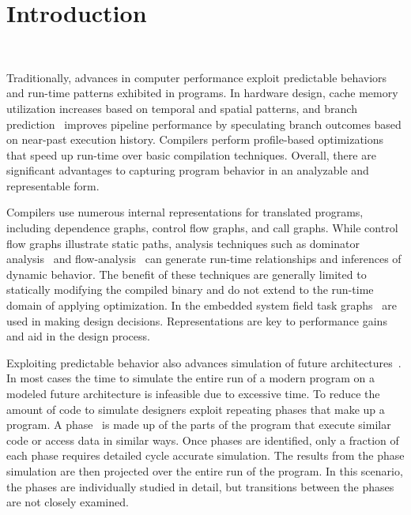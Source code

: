 \chapter{Introduction}~\label{chap:introduction}

Traditionally, advances in computer performance exploit predictable
behaviors and run-time patterns exhibited in programs. In hardware
design, cache memory~\cite{cache-1} utilization increases based on
temporal and spatial patterns, and branch prediction~\cite{brpr-1}
improves pipeline performance by speculating branch outcomes based on
near-past execution history. Compilers perform profile-based
optimizations~\cite{com_prof-1} that speed up run-time over basic
compilation techniques. Overall,
there are significant advantages to capturing program
behavior in an analyzable and representable form.

Compilers use numerous internal representations for translated
programs, including dependence graphs, control flow graphs, and
call graphs. While control flow graphs illustrate static paths,
analysis techniques such as dominator analysis~\cite{com_dom-1,
com_dom-2} and flow-analysis~\cite{com_flow-1, com_flow-2} can
generate run-time relationships and inferences of dynamic
behavior. The benefit of these techniques are generally limited to statically
modifying the
compiled binary and do not extend to the run-time domain of applying
optimization. In the embedded system field task graphs~\cite{task-graph} are
used in making design decisions. Representations are key to performance gains
and aid in the design process.

Exploiting predictable behavior also advances simulation of future
architectures~\cite{simpoint-1, simpoint-2}. In most cases the time
to simulate the entire run of a modern program on a modeled future
architecture is infeasible due to excessive time. To reduce the
amount of code to simulate designers exploit
repeating phases that make up a program. A
phase~\cite{simpoint-1, simpoint-2} is made up of the parts of the
program that execute similar code or access data in similar
ways. Once phases are identified, only a fraction of each phase
requires detailed cycle accurate simulation. The results from the phase
simulation are then projected over the entire run of the
program. In this scenario, the phases are individually studied in
detail, but transitions between the phases are not closely examined.

